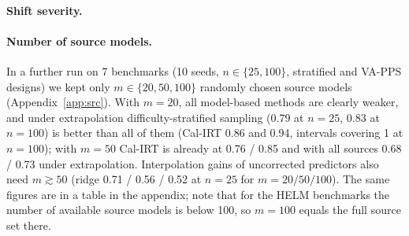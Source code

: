 \paragraph{Shift severity.}


\paragraph{Number of source models.}
In a further run on 7 benchmarks (10 seeds, $n\in\{25,100\}$, stratified and VA-PPS designs) we kept only $m\in\{20,50,100\}$ randomly chosen source models (Appendix~\ref{app:src}). With $m=20$, all model-based methods are clearly weaker, and under extrapolation difficulty-stratified sampling (0.79 at $n=25$, 0.83 at $n=100$) is better than all of them (Cal-IRT 0.86 and 0.94, intervals covering 1 at $n=100$); with $m=50$ Cal-IRT is already at 0.76 / 0.85 and with all sources 0.68 / 0.73 under extrapolation. Interpolation gains of uncorrected predictors also need $m\gtrsim50$ (ridge 0.71 / 0.56 / 0.52 at $n=25$ for $m=20/50/100$). The same figures are in a table in the appendix; note that for the HELM benchmarks the number of available source models is below 100, so $m=100$ equals the full source set there.
